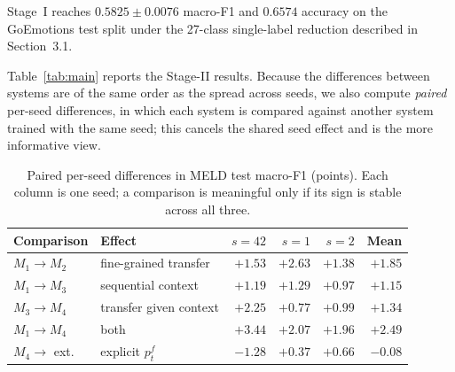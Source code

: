 \documentclass[sigconf,nonacm]{acmart}
\begin{document}
Stage~I reaches $0.5825 \pm 0.0076$ macro-F1 and $0.6574$ accuracy on the GoEmotions test
split under the 27-class single-label reduction described in Section~3.1.

Table~\ref{tab:main} reports the Stage-II results. Because the differences between systems
are of the same order as the spread across seeds, we also compute \emph{paired} per-seed
differences, in which each system is compared against another system trained with the same
seed; this cancels the shared seed effect and is the more informative view.

\begin{table}[t]
\centering
\caption{Paired per-seed differences in MELD test macro-F1 (points). Each column is one
seed; a comparison is meaningful only if its sign is stable across all three.}
\label{tab:paired}
\begin{tabular}{llrrrr}
\toprule
Comparison & Effect & $s{=}42$ & $s{=}1$ & $s{=}2$ & Mean \\
\midrule
$M_1 \rightarrow M_2$ & fine-grained transfer            & $+1.53$ & $+2.63$ & $+1.38$ & $+1.85$ \\
$M_1 \rightarrow M_3$ & sequential context               & $+1.19$ & $+1.29$ & $+0.97$ & $+1.15$ \\
$M_3 \rightarrow M_4$ & transfer given context           & $+2.25$ & $+0.77$ & $+0.99$ & $+1.34$ \\
$M_1 \rightarrow M_4$ & both                             & $+3.44$ & $+2.07$ & $+1.96$ & $+2.49$ \\
\midrule
$M_4 \rightarrow$ ext. & explicit $p^f_t$                & $-1.28$ & $+0.37$ & $+0.66$ & $-0.08$ \\
\bottomrule
\end{tabular}
\end{table}
\end{document}
